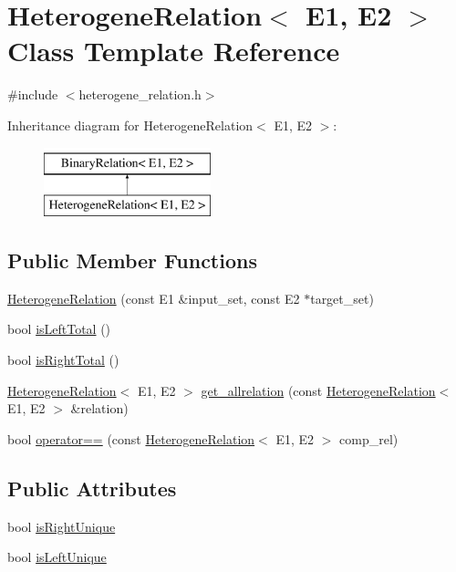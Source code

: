 \hypertarget{classHeterogeneRelation}{}\section{Heterogene\+Relation$<$ E1, E2 $>$ Class Template Reference}
\label{classHeterogeneRelation}


{\ttfamily \#include $<$heterogene\+\_\+relation.\+h$>$}

Inheritance diagram for Heterogene\+Relation$<$ E1, E2 $>$\+:\begin{figure}[H]
\begin{center}
\leavevmode
\includegraphics[height=2.000000cm]{classHeterogeneRelation}
\end{center}
\end{figure}
\subsection*{Public Member Functions}
\begin{DoxyCompactItemize}
\item 
\hyperlink{classHeterogeneRelation_ae52386d0704e75fe637e248177f3c115}{Heterogene\+Relation} (const E1 \&input\+\_\+set, const E2 $\ast$target\+\_\+set)
\item 
bool \hyperlink{classHeterogeneRelation_abbf37fad2ecbca677a17f18bd0289677}{is\+Left\+Total} ()
\item 
bool \hyperlink{classHeterogeneRelation_acba9016716a59fa6293eed4bbe1e6e24}{is\+Right\+Total} ()
\item 
\hyperlink{classHeterogeneRelation}{Heterogene\+Relation}$<$ E1, E2 $>$ \hyperlink{classHeterogeneRelation_ad96994e87bceb98db4bc2c3ae5c5d93a}{get\+\_\+allrelation} (const \hyperlink{classHeterogeneRelation}{Heterogene\+Relation}$<$ E1, E2 $>$ \&relation)
\item 
bool \hyperlink{classHeterogeneRelation_a4e877b05eca9b47d2eb3fc15d904ddd3}{operator==} (const \hyperlink{classHeterogeneRelation}{Heterogene\+Relation}$<$ E1, E2 $>$ comp\+\_\+rel)
\end{DoxyCompactItemize}
\subsection*{Public Attributes}
\begin{DoxyCompactItemize}
\item 
bool \hyperlink{classHeterogeneRelation_a0250c13dffd96c0b880d26cd94a89d0c}{is\+Right\+Unique}
\item 
bool \hyperlink{classHeterogeneRelation_a2c21f4a631adeb1dc9ff7b1affce6320}{is\+Left\+Unique}
\end{DoxyCompactItemize}


